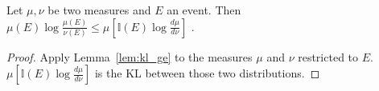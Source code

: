 \begin{lemma}
  \label{lem:expectation_llr_event}
  Let $\mu, \nu$ be two measures and $E$ an event. Then
  $\mu(E)\log\frac{\mu(E)}{\nu(E)} \le \mu\left[\mathbb{I}(E)\log \frac{d \mu}{d \nu}\right]$ .
\end{lemma}

\begin{proof}
Apply Lemma~\ref{lem:kl_ge} to the measures $\mu$ and $\nu$ restricted to $E$. $\mu\left[\mathbb{I}(E)\log \frac{d \mu}{d \nu}\right]$ is the KL between those two distributions.
\end{proof}